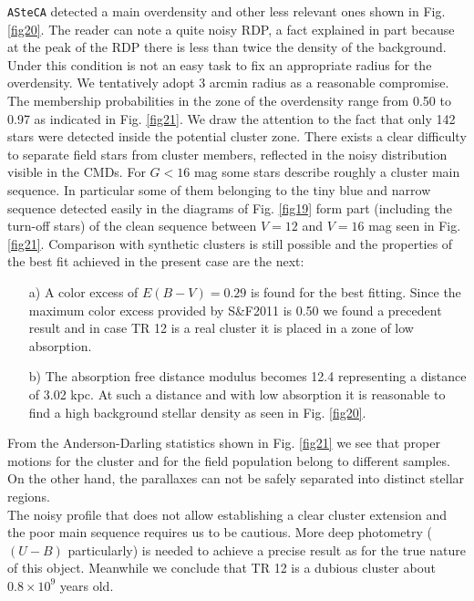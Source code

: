 \documentclass[draft]{aa}
\begin{document}
\texttt{ASteCA} detected a main overdensity and other less relevant ones shown
in Fig. \ref{fig20}. The reader can note a quite noisy RDP, a fact explained in
part because at the peak of the RDP there is less than twice the density of the
background. Under this condition is not an easy task to fix an appropriate
radius for the overdensity. We tentatively adopt 3 arcmin radius as a reasonable
compromise. The membership probabilities in the zone of the overdensity range
from 0.50 to 0.97 as indicated in Fig. \ref{fig21}. We draw the attention to
the fact that only 142 stars were detected inside the potential cluster zone.
%
There exists a clear difficulty to separate field stars from cluster
members, reflected in the noisy distribution visible in the CMDs. For $G<16$
mag some stars describe roughly a cluster main sequence.
In particular some of them belonging to the tiny blue and narrow
sequence detected easily in the diagrams of Fig. \ref{fig19} form part
(including the turn-off stars) of the clean sequence between $V = 12$ and $V =
16$ mag seen in Fig. \ref{fig21}. Comparison with synthetic clusters is still
possible and the properties of the best fit achieved in the present case are the
next:

\begin{itemize}
\item [a)] A color excess of $E(B-V) = 0.29$ is found for the best fitting.
    Since the maximum color excess provided by S\&F2011 is 0.50 we found a
    precedent result and in case TR 12 is a real cluster it is placed in a
    zone of low absorption.
\item [b)] The absorption free distance modulus becomes 12.4 representing a
    distance of 3.02 kpc. At such a distance and with low absorption it is
    reasonable to find a high background stellar density as seen in Fig. 
    \ref{fig20}.
\end{itemize}

From the Anderson-Darling statistics shown in Fig. \ref{fig21} we see that
proper motions for the cluster and for the field population belong to different
samples. On the other hand, the parallaxes can not be safely separated into
distinct stellar regions.\\

The noisy profile that does not allow establishing a clear cluster extension
and the poor main sequence requires us to be cautious. More deep photometry
($(U-B)$ particularly) is needed to achieve a precise result as for the true
nature of this object. Meanwhile we conclude that TR 12 is a dubious cluster
about $0.8\times10^9$ years old.
\end{document}
